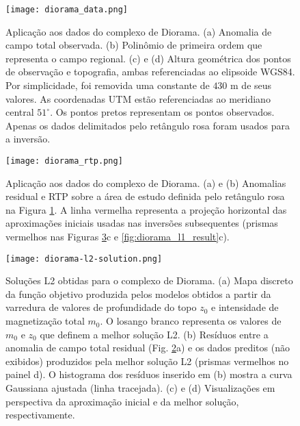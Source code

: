 
\begin{figure}[!htb]
	\texttt{[image: diorama\_data.png]}
	\caption{Aplicação aos dados do complexo de Diorama. 
		(a) Anomalia de campo total observada.
		(b) Polinômio de primeira ordem que representa o campo regional.
		(c) e (d) Altura geométrica dos pontos de observação e topografia,
		ambas referenciadas ao elipsoide WGS84. Por simplicidade, foi removida uma constante de $430$ m de seus valores. As coordenadas UTM estão referenciadas ao meridiano central $51^{\circ}$. Os pontos pretos representam os pontos observados. Apenas os dados delimitados pelo retângulo rosa foram usados para a inversão. 
	}
	\label{fig:diorama_data}
\end{figure}
\pagebreak

\begin{figure}[!htb]
	\texttt{[image: diorama\_rtp.png]}
	\caption{Aplicação aos dados do complexo de Diorama. 
		(a) e (b) Anomalias residual e RTP sobre a área de estudo definida pelo retângulo rosa na Figura \ref{fig:diorama_data}.
		A linha vermelha representa a projeção horizontal das aproximações iniciais usadas nas inversões subsequentes (prismas vermelhos nas Figuras \ref{fig:diorama_l2_result}c e \ref{fig:diorama_l1_result}c).
	}
	\label{fig:diorama_rtp_residual}
\end{figure}

\pagebreak
\begin{figure}[!htb]
	\texttt{[image: diorama-l2-solution.png]}
	\caption{Soluções L2 obtidas para o complexo de Diorama. 
		(a) Mapa discreto da função objetivo produzida pelos modelos obtidos a partir da varredura de valores de profundidade do topo $z_{0}$ e intensidade de magnetização total $m_{0}$. 
		O losango branco representa os valores de $m_{0}$ e $z_{0}$ que definem a melhor solução L2.
		(b) Resíduos entre a anomalia de campo total residual (Fig. \ref{fig:diorama_rtp_residual}a) e os dados preditos (não exibidos) produzidos pela melhor solução L2 (prismas vermelhos no painel d). 
		O histograma dos resíduos inserido em (b) mostra a curva
		Gaussiana ajustada (linha tracejada). 
		(c) e (d) Visualizações em perspectiva da aproximação inicial e da melhor solução, respectivamente.
	}
	\label{fig:diorama_l2_result}
\end{figure}

